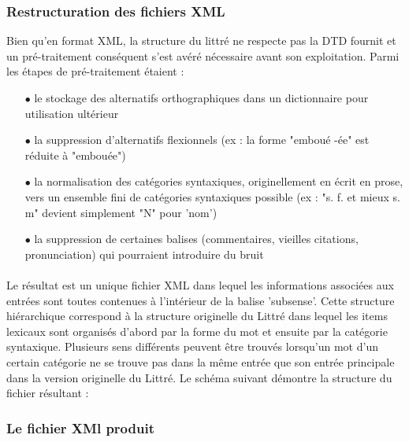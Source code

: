 \documentclass{article}
\begin{document}
\subsubsection{Restructuration des fichiers XML}
Bien qu'en format XML, la structure du littré ne respecte pas la DTD fournit et un pré-traitement conséquent s'est avéré nécessaire avant son exploitation. Parmi les étapes de pré-traitement étaient :
\\
    \begin{itemize}
        \item[$\bullet$] le stockage des alternatifs orthographiques dans un dictionnaire pour utilisation ultérieur
        \item[$\bullet$] la suppression d'alternatifs flexionnels (ex : la forme "emboué -ée" est réduite à "embouée")
        \item[$\bullet$] la normalisation des catégories syntaxiques, originellement en écrit en prose, vers un ensemble fini de catégories syntaxiques possible (ex : "s. f. et mieux s. m" devient simplement "N" pour 'nom')
        \item[$\bullet$] la suppression de certaines balises (commentaires, vieilles citations, pronunciation) qui pourraient introduire du bruit
    \end{itemize}

\paragraph{}
Le résultat est un unique fichier XML dans lequel les informations associées aux entrées sont toutes contenues à l'intérieur de la balise 'subsense'. Cette structure hiérarchique correspond à la structure originelle du Littré dans lequel les items lexicaux sont organisés d'abord par la forme du mot et ensuite par la catégorie syntaxique. Plusieurs sens différents peuvent être trouvés lorsqu'un mot d'un certain catégorie ne se trouve pas dans la même entrée que son entrée principale dans la version originelle du Littré. Le schéma suivant démontre la structure du fichier résultant :



\subsubsection{Le fichier XMl produit}
\end{document}
